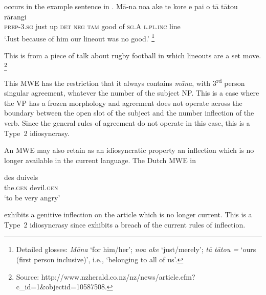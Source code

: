 \documentclass[output=paper]{langsci/langscibook}
\begin{document}
\noindent
occurs in the 
example sentence in .
\ea\label{ex:ex16b}
\gll %
M\=a-na      noa ake te     kore e         pai    o  t\=a     t\=atou        r\=arangi\\
\textsc{prep}-\textsc{3.sg}  just up  \textsc{det} \textsc{neg} \textsc{tam}  good of \textsc{sg.A} \textsc{l.pl.inc}  line\\
\glt `Just because of him our lineout was no good.’%
\footnote{Detailed glosses: 
\textit{M\=ana} `for him/her'; 
\textit{noa ake} `just/merely'; 
\textit{t\=a t\=atou =} `ours (first person inclusive)', i.e., `belonging to all of us'.
}
\z


\noindent
This is from a piece of talk about rugby football in which lineouts are a set move.%
\footnote{Source: http://www.nzherald.co.nz/nz/news/article.cfm?c\_id=1\&objectid=10587508.}


This MWE has the restriction that it always contains \textit{m\=ana}, with 3\textsuperscript{rd} person singular agreement, whatever the number of the subject NP. This is a case where the VP has a frozen morphology and agreement does not operate across the boundary between the open slot of the subject and the number inflection of the verb. Since the general rules of agreement do not operate in this case, this is a Type~2 idiosyncrasy.

An MWE may also retain as an idiosyncratic property an inflection which is no longer available in the current language. The Dutch MWE in  

\ea
\label{ex:ex17}\gll des duivels\\
     the.\textsc{gen} devil.\textsc{gen}\\
\glt ‘to be very angry’ 
\z

\noindent
exhibits a genitive inflection  on the article which is no longer current. This is a Type~2 idiosyncrasy since  exhibits a breach of the current rules of inflection.
\end{document}
